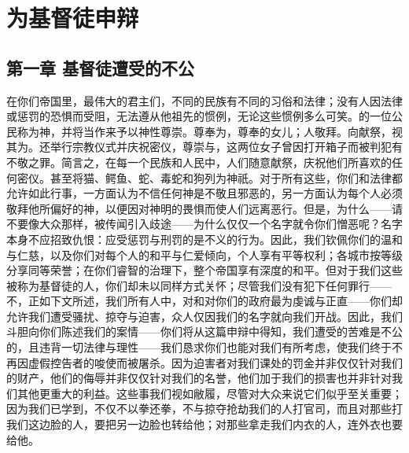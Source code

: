 
\chapter{为基督徒申辩}


\par

\par


\section{第一章 基督徒遭受的不公}

在你们帝国里，最伟大的君主们，不同的民族有不同的习俗和法律；没有人因法律或惩罚的恐惧而受阻，无法遵从他祖先的惯例，无论这些惯例多么可笑。的一位公民称为神，并将当作来予以神性尊崇。尊奉为，尊奉的女儿；人敬拜。向献祭，视其为。还举行宗教仪式并庆祝密仪，尊崇与，这两位女子曾因打开箱子而被判犯有不敬之罪。简言之，在每一个民族和人民中，人们随意献祭，庆祝他们所喜欢的任何密仪。甚至将猫、鳄鱼、蛇、毒蛇和狗列为神祇。对于所有这些，你们和法律都允许如此行事，一方面认为不信任何神是不敬且邪恶的，另一方面认为每个人必须敬拜他所偏好的神，以便因对神明的畏惧而使人们远离恶行。但是，为什么——请不要像大众那样，被传闻引入歧途——为什么仅仅一个名字就令你们憎恶呢？名字本身不应招致仇恨：应受惩罚与刑罚的是不义的行为。因此，我们钦佩你们的温和与仁慈，以及你们对每个人的和平与仁爱倾向，个人享有平等权利；各城市按等级分享同等荣誉；在你们睿智的治理下，整个帝国享有深度的和平。但对于我们这些被称为基督徒的人，你们却未以同样方式关怀；尽管我们没有犯下任何罪行——不，正如下文所述，我们所有人中，对和对你们的政府最为虔诚与正直——你们却允许我们遭受骚扰、掠夺与迫害，众人仅因我们的名字就向我们开战。因此，我们斗胆向你们陈述我们的案情——你们将从这篇申辩中得知，我们遭受的苦难是不公的，且违背一切法律与理性——我们恳求你们也能对我们有所考虑，使我们终于不再因虚假控告者的唆使而被屠杀。因为迫害者对我们课处的罚金并非仅仅针对我们的财产，他们的侮辱并非仅仅针对我们的名誉，他们加于我们的损害也并非针对我们其他更重大的利益。这些事我们视如敝履，尽管对大众来说它们似乎至关重要；因为我们已学到，不仅不以拳还拳，不与掠夺抢劫我们的人打官司，而且对那些打我们这边脸的人，要把另一边脸也转给他；对那些拿走我们内衣的人，连外衣也要给他。\par

